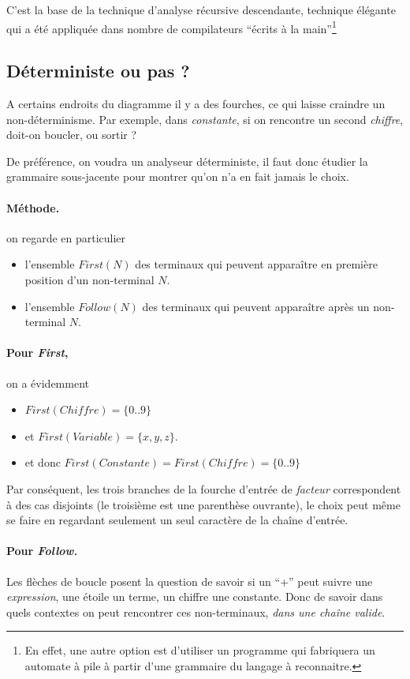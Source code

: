 {C'est la base de la technique d'analyse récursive descendante,
technique élégante qui a été appliquée dans nombre de compilateurs
``écrits à la main''\footnote{En effet, une autre option est d'utiliser un programme qui fabriquera un
automate à pile à partir d'une grammaire du langage à reconnaitre.}

\subsection{Déterministe ou pas ?}

A certains endroits du diagramme il y a des fourches, ce qui laisse craindre
un non-déterminisme. Par exemple, dans
\emph{constante}, si on rencontre un second \emph{chiffre}, doit-on 
boucler, ou sortir ?

De préférence, on voudra un analyseur déterministe, il faut donc
étudier la grammaire sous-jacente pour montrer qu'on n'a en fait
jamais le choix.

\paragraph{Méthode. } on regarde en particulier 
\begin{itemize}
\item l'ensemble $First(N)$ 
des terminaux qui peuvent apparaître en première position d'un
non-terminal $N$.
\item l'ensemble $Follow(N)$ 
des terminaux qui peuvent apparaître après un
non-terminal $N$.
\end{itemize}

\paragraph{Pour \emph{First},} on a évidemment 
\begin{itemize}
\item $First(Chiffre) = \{ 0 .. 9 \} $ 
\item et 
$First(Variable) = \{ x, y, z \} $.
\item et donc $First(Constante) = First(Chiffre) = \{ 0 .. 9 \} $
\end{itemize}
Par conséquent, les trois branches de la fourche d'entrée de
\emph{facteur} correspondent à des cas disjoints (le troisième est une
parenthèse ouvrante), le choix peut même se faire en regardant
seulement un seul caractère de la chaîne d'entrée.

\paragraph{Pour \emph{Follow.}}
Les flèches de boucle posent la question de savoir si un ``+''
peut suivre une \emph{expression}, une étoile un terme, un chiffre une
constante. Donc de savoir dans quels contextes on peut rencontrer ces
non-terminaux, \emph{dans une chaîne valide}.

}

